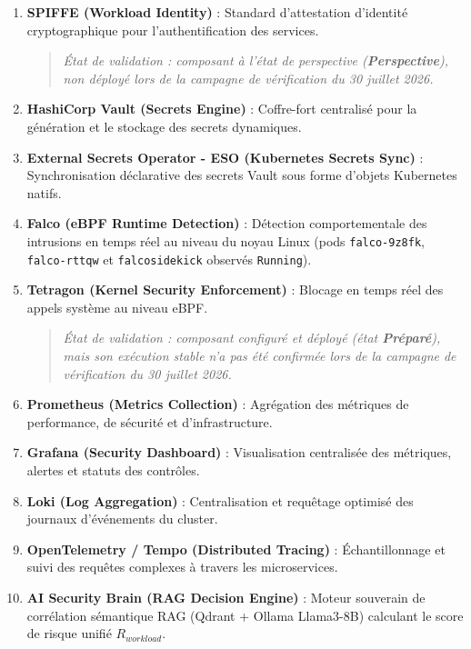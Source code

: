 \begin{enumerate}
    \begin{quote}
    \itshape État de validation : composant configuré et déployé (état \textbf{Préparé}), mais son exécution stable n'a pas été confirmée lors de la campagne de vérification du 30 juillet 2026.
    \end{quote}
    \item \textbf{SPIFFE (Workload Identity)} : Standard d'attestation d'identité cryptographique pour l'authentification des services.
    \begin{quote}
    \itshape État de validation : composant à l'état de perspective (\textbf{Perspective}), non déployé lors de la campagne de vérification du 30 juillet 2026.
    \end{quote}
    \item \textbf{HashiCorp Vault (Secrets Engine)} : Coffre-fort centralisé pour la génération et le stockage des secrets dynamiques.
    \item \textbf{External Secrets Operator - ESO (Kubernetes Secrets Sync)} : Synchronisation déclarative des secrets Vault sous forme d'objets Kubernetes natifs.
    \item \textbf{Falco (eBPF Runtime Detection)} : Détection comportementale des intrusions en temps réel au niveau du noyau Linux (pods \texttt{falco-9z8fk}, \texttt{falco-rttqw} et \texttt{falcosidekick} observés \texttt{Running}).
    \item \textbf{Tetragon (Kernel Security Enforcement)} : Blocage en temps réel des appels système au niveau eBPF.
    \begin{quote}
    \itshape État de validation : composant configuré et déployé (état \textbf{Préparé}), mais son exécution stable n'a pas été confirmée lors de la campagne de vérification du 30 juillet 2026.
    \end{quote}
    \item \textbf{Prometheus (Metrics Collection)} : Agrégation des métriques de performance, de sécurité et d'infrastructure.
    \item \textbf{Grafana (Security Dashboard)} : Visualisation centralisée des métriques, alertes et statuts des contrôles.
    \item \textbf{Loki (Log Aggregation)} : Centralisation et requêtage optimisé des journaux d'événements du cluster.
    \item \textbf{OpenTelemetry / Tempo (Distributed Tracing)} : Échantillonnage et suivi des requêtes complexes à travers les microservices.
    \item \textbf{AI Security Brain (RAG Decision Engine)} : Moteur souverain de corrélation sémantique RAG (Qdrant + Ollama Llama3-8B) calculant le score de risque unifié $R_{workload}$.
\end{enumerate}


